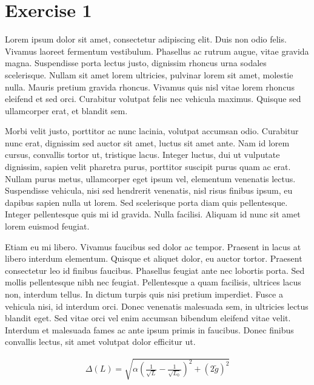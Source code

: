 

\hypersetup{
}
\lfoot{}
\cfoot{}
\rfoot{\thepage}




\section*{Exercise 1}
Lorem ipsum dolor sit amet, consectetur adipiscing elit. Duis non odio felis. Vivamus laoreet fermentum vestibulum. Phasellus ac rutrum augue, vitae gravida magna. Suspendisse porta lectus justo, dignissim rhoncus urna sodales scelerisque. Nullam sit amet lorem ultricies, pulvinar lorem sit amet, molestie nulla. Mauris pretium gravida rhoncus. Vivamus quis nisl vitae lorem rhoncus eleifend et sed orci. Curabitur volutpat felis nec vehicula maximus. Quisque sed ullamcorper erat, et blandit sem.

Morbi velit justo, porttitor ac nunc lacinia, volutpat accumsan odio. Curabitur nunc erat, dignissim sed auctor sit amet, luctus sit amet ante. Nam id lorem cursus, convallis tortor ut, tristique lacus. Integer luctus, dui ut vulputate dignissim, sapien velit pharetra purus, porttitor suscipit purus quam ac erat. Nullam purus metus, ullamcorper eget ipsum vel, elementum venenatis lectus. Suspendisse vehicula, nisi sed hendrerit venenatis, nisl risus finibus ipsum, eu dapibus sapien nulla ut lorem. Sed scelerisque porta diam quis pellentesque. Integer pellentesque quis mi id gravida. Nulla facilisi. Aliquam id nunc sit amet lorem euismod feugiat.

Etiam eu mi libero. Vivamus faucibus sed dolor ac tempor. Praesent in lacus at libero interdum elementum. Quisque et aliquet dolor, eu auctor tortor. Praesent consectetur leo id finibus faucibus. Phasellus feugiat ante nec lobortis porta. Sed mollis pellentesque nibh nec feugiat. Pellentesque a quam facilisis, ultrices lacus non, interdum tellus. In dictum turpis quis nisi pretium imperdiet. Fusce a vehicula nisi, id interdum orci. Donec venenatis malesuada sem, in ultricies lectus blandit eget. Sed vitae orci vel enim accumsan bibendum eleifend vitae velit. Interdum et malesuada fames ac ante ipsum primis in faucibus. Donec finibus convallis lectus, sit amet volutpat dolor efficitur ut.

\begin{align*}
    \Delta(L)=\sqrt{\alpha\left( \frac{1}{\sqrt{L}} - \frac{1}{\sqrt{L_0}}  \right)^2 + (2\tilde{g})^2}
\end{align*}





\newpage
\pagestyle{plain}
\renewcommand*{\bibfont}{\footnotesize}
\printbibliography



